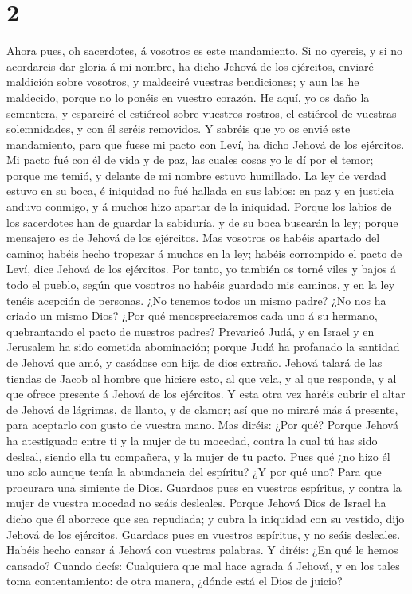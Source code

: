 \hypertarget{section-1}{%
\section{2}\label{section-1}}

 Ahora pues, oh sacerdotes, á vosotros es este mandamiento.
 Si no oyereis, y si no acordareis dar gloria á mi nombre,
ha dicho Jehová de los ejércitos, enviaré maldición sobre vosotros, y
maldeciré vuestras bendiciones; y aun las he maldecido, porque no lo
ponéis en vuestro corazón.  He aquí, yo os daño la
sementera, y esparciré el estiércol sobre vuestros rostros, el estiércol
de vuestras solemnidades, y con él seréis removidos.  Y
sabréis que yo os envié este mandamiento, para que fuese mi pacto con
Leví, ha dicho Jehová de los ejércitos.  Mi pacto fué con él
de vida y de paz, las cuales cosas yo le dí por el temor; porque me
temió, y delante de mi nombre estuvo humillado.  La ley de
verdad estuvo en su boca, é iniquidad no fué hallada en sus labios: en
paz y en justicia anduvo conmigo, y á muchos hizo apartar de la
iniquidad.  Porque los labios de los sacerdotes han de
guardar la sabiduría, y de su boca buscarán la ley; porque mensajero es
de Jehová de los ejércitos.  Mas vosotros os habéis apartado
del camino; habéis hecho tropezar á muchos en la ley; habéis corrompido
el pacto de Leví, dice Jehová de los ejércitos.  Por tanto,
yo también os torné viles y bajos á todo el pueblo, según que vosotros
no habéis guardado mis caminos, y en la ley tenéis acepción de personas.
 ¿No tenemos todos un mismo padre? ¿No nos ha criado un
mismo Dios? ¿Por qué menospreciaremos cada uno á su hermano,
quebrantando el pacto de nuestros padres?  Prevaricó Judá,
y en Israel y en Jerusalem ha sido cometida abominación; porque Judá ha
profanado la santidad de Jehová que amó, y casádose con hija de dios
extraño.  Jehová talará de las tiendas de Jacob al hombre
que hiciere esto, al que vela, y al que responde, y al que ofrece
presente á Jehová de los ejércitos.  Y esta otra vez haréis
cubrir el altar de Jehová de lágrimas, de llanto, y de clamor; así que
no miraré más á presente, para aceptarlo con gusto de vuestra mano.
 Mas diréis: ¿Por qué? Porque Jehová ha atestiguado entre
ti y la mujer de tu mocedad, contra la cual tú has sido desleal, siendo
ella tu compañera, y la mujer de tu pacto.  Pues qué ¿no
hizo él uno solo aunque tenía la abundancia del espíritu? ¿Y por qué
uno? Para que procurara una simiente de Dios. Guardaos pues en vuestros
espíritus, y contra la mujer de vuestra mocedad no seáis desleales.
 Porque Jehová Dios de Israel ha dicho que él aborrece que
sea repudiada; y cubra la iniquidad con su vestido, dijo Jehová de los
ejércitos. Guardaos pues en vuestros espíritus, y no seáis desleales.
 Habéis hecho cansar á Jehová con vuestras palabras. Y
diréis: ¿En qué le hemos cansado? Cuando decís: Cualquiera que mal hace
agrada á Jehová, y en los tales toma contentamiento: de otra manera,
¿dónde está el Dios de juicio?

